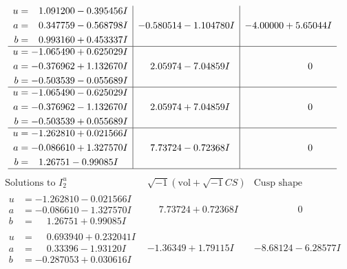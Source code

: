\documentclass[1p]{elsarticle_modified}
\theoremstyle{definition}
\newcommand{\I}{\sqrt{-1}}
\begin{document}
$$\begin{array}{c|c|c}
\begin{aligned}
u &= \phantom{-}1.091200 - 0.395456 I \\
a &= \phantom{-}0.347759 - 0.568798 I \\
b &= \phantom{-}0.993160 + 0.453337 I\end{aligned}
 & -0.580514 - 1.104780 I & -4.00000 + 5.65044 I \\ \hline\begin{aligned}
u &= -1.065490 + 0.625029 I \\
a &= -0.376962 + 1.132670 I \\
b &= -0.503539 - 0.055689 I\end{aligned}
 & \phantom{-}2.05974 - 7.04859 I & \phantom{-0.000000 } 0 \\ \hline\begin{aligned}
u &= -1.065490 - 0.625029 I \\
a &= -0.376962 - 1.132670 I \\
b &= -0.503539 + 0.055689 I\end{aligned}
 & \phantom{-}2.05974 + 7.04859 I & \phantom{-0.000000 } 0 \\ \hline\begin{aligned}
u &= -1.262810 + 0.021566 I \\
a &= -0.086610 + 1.327570 I \\
b &= \phantom{-}1.26751 - 0.99085 I\end{aligned}
 & \phantom{-}7.73724 - 0.72368 I & \phantom{-0.000000 } 0\\
 \hline 
 \end{array}$$\newpage$$\begin{array}{c|c|c}  
\text{Solutions to }I^u_{2}& \I (\text{vol} + \sqrt{-1}CS) & \text{Cusp shape}\\
 \hline 
\begin{aligned}
u &= -1.262810 - 0.021566 I \\
a &= -0.086610 - 1.327570 I \\
b &= \phantom{-}1.26751 + 0.99085 I\end{aligned}
 & \phantom{-}7.73724 + 0.72368 I & \phantom{-0.000000 } 0 \\ \hline\begin{aligned}
u &= \phantom{-}0.693940 + 0.232041 I \\
a &= \phantom{-}0.33396 - 1.93120 I \\
b &= -0.287053 + 0.030616 I\end{aligned}
 & -1.36349 + 1.79115 I & -8.68124 - 6.28577 I \\ \hline\begin{aligned}

\end{aligned}
\end{array}$$
\end{document}
